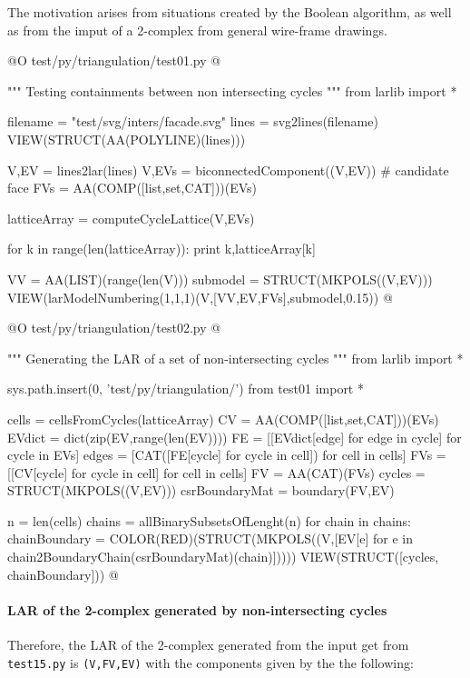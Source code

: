 \documentclass[11pt,oneside]{article}    %
\begin{document}
The motivation arises from situations created by the Boolean algorithm, as well as from the imput of a 2-complex from general wire-frame drawings.

@O test/py/triangulation/test01.py
@{""" Testing containments between non intersecting cycles """
from larlib import *

filename = "test/svg/inters/facade.svg"
lines = svg2lines(filename)
VIEW(STRUCT(AA(POLYLINE)(lines)))

V,EV = lines2lar(lines)
V,EVs = biconnectedComponent((V,EV))
# candidate face
FVs = AA(COMP([list,set,CAT]))(EVs)

latticeArray = computeCycleLattice(V,EVs)

for k in range(len(latticeArray)):
   print k,latticeArray[k]

VV = AA(LIST)(range(len(V)))
submodel = STRUCT(MKPOLS((V,EV)))
VIEW(larModelNumbering(1,1,1)(V,[VV,EV,FVs],submodel,0.15)) 
@}


@O test/py/triangulation/test02.py
@{""" Generating the LAR of a set of non-intersecting cycles """
from larlib import *

sys.path.insert(0, 'test/py/triangulation/')
from test01 import *

cells = cellsFromCycles(latticeArray)
CV = AA(COMP([list,set,CAT]))(EVs)
EVdict = dict(zip(EV,range(len(EV))))
FE = [[EVdict[edge] for edge in cycle] for cycle in EVs] 
edges = [CAT([FE[cycle] for cycle in cell]) for cell in cells]
FVs = [[CV[cycle] for cycle in cell] for cell in cells]
FV = AA(CAT)(FVs)
cycles = STRUCT(MKPOLS((V,EV)))
csrBoundaryMat = boundary(FV,EV)

n = len(cells)
chains = allBinarySubsetsOfLenght(n)
for chain in chains:
    chainBoundary = COLOR(RED)(STRUCT(MKPOLS((V,[EV[e] 
                        for e in chain2BoundaryChain(csrBoundaryMat)(chain)]))))
    VIEW(STRUCT([cycles, chainBoundary]))
@}


\paragraph{LAR of the 2-complex generated by non-intersecting cycles}

Therefore, the LAR of the 2-complex generated from the input get from \texttt{test15.py}
is \texttt{(V,FV,EV)} with the components given by the the following:
\end{document}
